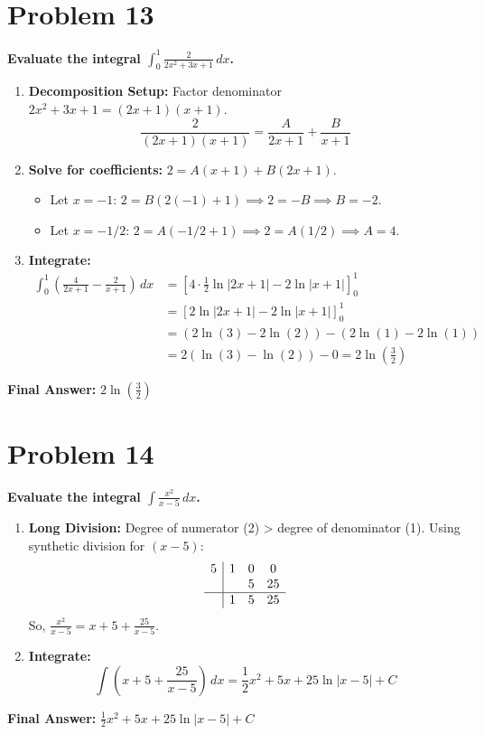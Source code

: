 \documentclass{article}
\begin{document}
\section{Problem 13}
\textbf{Evaluate the integral $\displaystyle\int_0^1 \frac{2}{2x^2+3x+1} \,dx$.}
\begin{enumerate}
    \item \textbf{Decomposition Setup:} Factor denominator $2x^2+3x+1=(2x+1)(x+1)$.
    \[ \frac{2}{(2x+1)(x+1)} = \frac{A}{2x+1} + \frac{B}{x+1} \]
    \item \textbf{Solve for coefficients:} $2 = A(x+1) + B(2x+1)$.
    \begin{itemize}
        \item Let $x=-1$: $2=B(2(-1)+1) \implies 2=-B \implies B=-2$.
        \item Let $x=-1/2$: $2=A(-1/2+1) \implies 2=A(1/2) \implies A=4$.
    \end{itemize}
    \item \textbf{Integrate:}
    \begin{align*}
    \int_0^1 \left( \frac{4}{2x+1} - \frac{2}{x+1} \right) \,dx &= \left[ 4\cdot\frac{1}{2}\ln|2x+1| - 2\ln|x+1| \right]_0^1 \\
    &= \left[ 2\ln|2x+1| - 2\ln|x+1| \right]_0^1 \\
    &= (2\ln(3) - 2\ln(2)) - (2\ln(1) - 2\ln(1)) \\
    &= 2(\ln(3)-\ln(2)) - 0 = 2\ln\left(\frac{3}{2}\right)
    \end{align*}
\end{enumerate}
\textbf{Final Answer:} $\displaystyle 2\ln\left(\frac{3}{2}\right)$

\section{Problem 14}
\textbf{Evaluate the integral $\displaystyle\int \frac{x^2}{x-5} \,dx$.}
\begin{enumerate}
    \item \textbf{Long Division:} Degree of numerator (2) > degree of denominator (1). Using synthetic division for $(x-5)$:
    \[
    \begin{array}{c|ccc}
    5 & 1 & 0 & 0 \\
      &   & 5 & 25 \\
    \hline
      & 1 & 5 & 25 \\
    \end{array}
    \]
    So, $\displaystyle\frac{x^2}{x-5} = x+5 + \frac{25}{x-5}$.
    \item \textbf{Integrate:}
    \[ \int \left( x+5 + \frac{25}{x-5} \right) \,dx = \frac{1}{2}x^2 + 5x + 25\ln|x-5| + C \]
\end{enumerate}
\textbf{Final Answer:} $\displaystyle\frac{1}{2}x^2 + 5x + 25\ln|x-5| + C$
\end{document}
